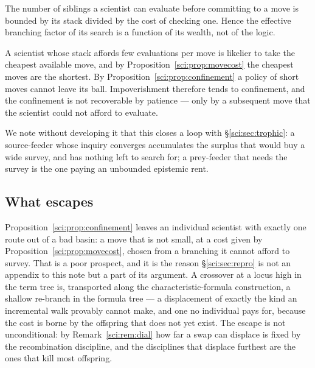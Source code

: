 \begin{proposition}
\label{sci:prop:branching}
The number of siblings a scientist can evaluate before committing to a move is bounded by its stack
divided by the cost of checking one. Hence the effective branching factor of its search is a function
of its wealth, not of the logic.
\end{proposition}

\begin{corollary}
\label{sci:cor:poverty}
A scientist whose stack affords few evaluations per move is likelier to take the cheapest available
move, and by Proposition~\ref{sci:prop:movecost} the cheapest moves are the shortest. By
Proposition~\ref{sci:prop:confinement} a policy of short moves cannot leave its ball. Impoverishment
therefore tends to confinement, and the confinement is not recoverable by patience --- only by a
subsequent move that the scientist could not afford to evaluate.
\end{corollary}

We note without developing it that this closes a loop with \S\ref{sci:sec:trophic}: a source-feeder whose
inquiry converges accumulates the surplus that would buy a wide survey, and has nothing left to search
for; a prey-feeder that needs the survey is the one paying an unbounded epistemic rent.

\subsection{What escapes}\label{sci:S6.5}
\label{sci:sec:escape}

Proposition~\ref{sci:prop:confinement} leaves an individual scientist with exactly one route out of a bad
basin: a move that is not small, at a cost given by Proposition~\ref{sci:prop:movecost}, chosen from a
branching it cannot afford to survey. That is a poor prospect, and it is the reason
\S\ref{sci:sec:repro} is not an appendix to this note but a part of its argument. A crossover at a locus
high in the term tree is, transported along the characteristic-formula construction, a shallow
re-branch in the formula tree --- a displacement of exactly the kind an incremental walk provably
cannot make, and one no individual pays for, because the cost is borne by the offspring that does not
yet exist. The escape is not unconditional: by Remark~\ref{sci:rem:dial} how far a swap can displace is
fixed by the recombination discipline, and the disciplines that displace furthest are the ones that
kill most offspring.

